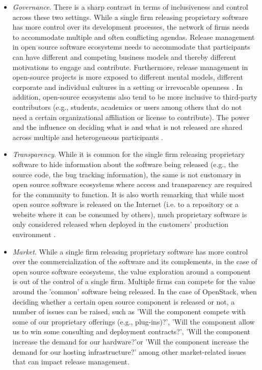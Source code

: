 \documentclass[dvipsnames]{bmcart}
\theoremstyle{definition}
\begin{document}
\begin{itemize}
 \item \textit{Governance}.  There is a sharp contrast in terms of inclusiveness and control across these two settings. While a single firm releasing proprietary software has more control over its development processes, the network of firms needs to accommodate multiple and often conflicting agendas. Release management in open source software ecosystems needs to accommodate that participants can have different and competing business models and thereby different motivations to engage and contribute. Furthermore, release management in open-source projects is more exposed to different mental models, different corporate and individual cultures in a setting or irrevocable openness \cite{howison2014collaboration}. 
 In addition, open-source ecosystems also tend to be more inclusive to third-party contributors (e.g., students, academics or users among others that do not need a certain organizational affiliation or license to contribute). The power and the influence on deciding what is and what is not released are shared across multiple and heterogeneous participants \cite{teixeira2015lessons}. 
 
 \item \textit{Transparency}.  While it is common for the single firm releasing proprietary software to hide information about the software being released (e.g., the source code, the bug tracking information), the same is not customary in open source software ecosystems where access and transparency are required for the community to function. It is also worth remarking that while most open source software is released on the Internet (i.e. to a repository or a website where it can be consumed by others), much proprietary software is only considered released when deployed in the customers' production environment \cite{Laukkanen2018}.
 
 \item \textit{Market}. While a single firm releasing proprietary software has more control over the commercialization of the software and its complements, in the case of open source software ecosystems, the value exploration around a component is out of the control of a single firm. Multiple firms can compete for the value around the 'common' software being released. In the case of OpenStack, when deciding whether a certain open source component is released or not, a number of issues can be raised, such as 'Will the component compete with some of our proprietary offerings (e.g., plug-ins)?', 'Will the component allow us to win some consulting and deployment contracts?', 'Will the component increase the demand for our hardware?'or 'Will the component increase the demand for our hosting infrastructure?'  among other market-related issues that can impact release management.


\end{itemize}
\end{document}
